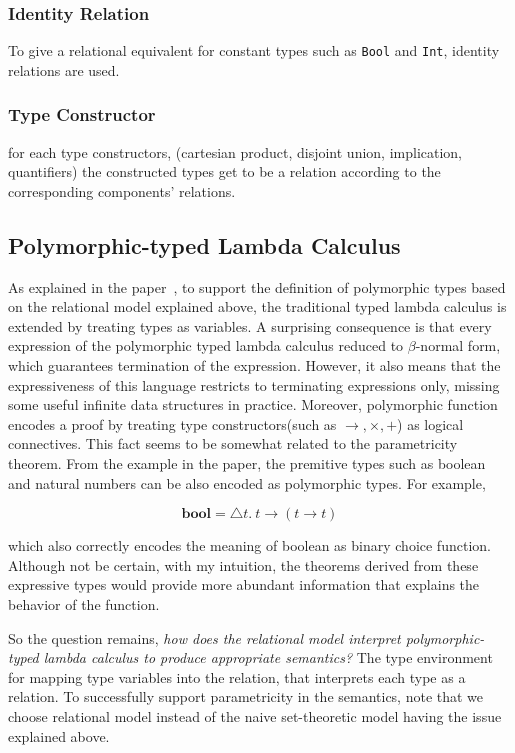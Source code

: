 \documentclass[sigconf]{acmart}
\begin{document}
\subsubsection{Identity Relation}

To give a relational equivalent for constant types such as \texttt{Bool} and \texttt{Int}, identity relations are used. 

\subsubsection{Type Constructor}
for each type constructors, (cartesian product, disjoint union, implication, quantifiers) the constructed types get to be a relation according to the corresponding components' relations. 


\subsection{Polymorphic-typed Lambda Calculus}

As explained in the paper~\cite{PolymorphicLambdaCal}, to support the definition of polymorphic types based on the relational model explained above, the traditional typed lambda calculus is extended by treating types as variables. A surprising consequence is that every expression of the polymorphic typed lambda calculus reduced to $\beta$-normal form, which guarantees termination of the expression. However, it also means that the expressiveness of this language restricts to terminating expressions only, missing some useful infinite data structures in practice. Moreover, polymorphic function encodes a proof by treating type constructors(such as $\rightarrow, \times, + $) as logical connectives. This fact seems to be somewhat related to the parametricity theorem. From the example in the paper, the premitive types such as boolean and natural numbers can be also encoded as polymorphic types. For example,

\[ \textbf{bool} = \triangle t. \: t \rightarrow \left( t \rightarrow t \right) \]

which also correctly encodes the meaning of boolean as binary choice function. Although not be certain, with my intuition, the theorems derived from these expressive types would provide more abundant information that explains the behavior of the function.  

So the question remains, \textit{how does the relational model interpret polymorphic-typed lambda calculus to produce appropriate semantics?} The type environment for mapping type variables into the relation, that interprets each type as a relation. To successfully support parametricity in the semantics, note that we choose relational model instead of the naive set-theoretic model having the issue explained above.
\end{document}

